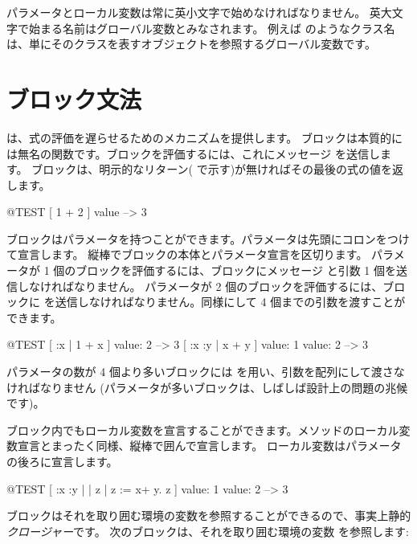 \documentclass[a4paper,10pt,twoside]{book}
\begin{document}
パラメータとローカル変数は常に英小文字で始めなければなりません。
英大文字で始まる名前はグローバル変数とみなされます。
例えば  のようなクラス名は、単にそのクラスを表すオブジェクトを参照するグローバル変数です。

\section{ブロック文法}

は、式の評価を遅らせるためのメカニズムを提供します。
ブロックは本質的には無名の関数です。ブロックを評価するには、これにメッセージ  を送信します。
ブロックは、明示的なリターン(\ct{^} で示す)が無ければその最後の式の値を返します。

\begin{code}{@TEST}
[ 1 + 2 ] value --> 3
\end{code}

ブロックはパラメータを持つことができます。パラメータは先頭にコロンをつけて宣言します。
縦棒でブロックの本体とパラメータ宣言を区切ります。
パラメータが 1 個のブロックを評価するには、ブロックにメッセージ  と引数 1 個を送信しなければなりません。
パラメータが 2 個のブロックを評価するには、ブロックに を送信しなければなりません。同様にして 4 個までの引数を渡すことができます。

\begin{code}{@TEST}
[ :x | 1 + x ] value: 2 --> 3
[ :x :y | x + y ] value: 1 value: 2 --> 3
\end{code}

パラメータの数が 4 個より多いブロックには  を用い、引数を配列にして渡さなければなりません
(パラメータが多いブロックは、しばしば設計上の問題の兆候です)。

ブロック内でもローカル変数を宣言することができます。メソッドのローカル変数宣言とまったく同様、縦棒で囲んで宣言します。
ローカル変数はパラメータの後ろに宣言します。

\begin{code}{@TEST}
[ :x :y | | z | z := x+ y. z ] value: 1 value: 2 --> 3
\end{code}

ブロックはそれを取り囲む環境の変数を参照することができるので、事実上静的\emph{クロージャー}です。
次のブロックは、それを取り囲む環境の変数  を参照します:
\end{document}
